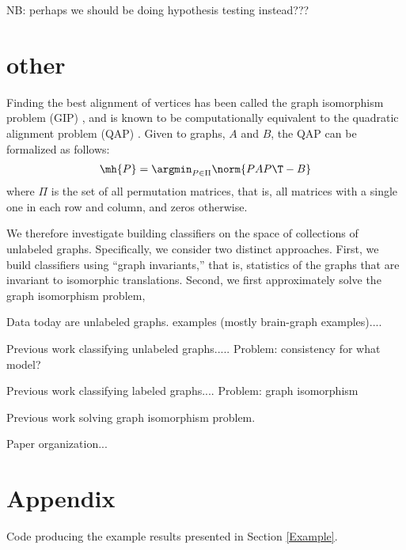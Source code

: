 NB: perhaps we should be doing hypothesis testing instead???



\section{other} %
\label{sec:other}



Finding the best alignment of vertices has been called the graph isomorphism problem (GIP) \cite{??}, and is known to be computationally equivalent to the quadratic alignment problem (QAP) \cite{??}.  Given to graphs, $A$ and $B$, the QAP can be formalized as follows:
\begin{align}
	\mh{P} = \argmin_{P \in \Pi} \norm{PAP\T - B}
\end{align}
where $\Pi$ is the set of all permutation matrices, that is, all matrices with a single one in each row and column, and zeros otherwise.  


We therefore investigate building classifiers on the space of collections of unlabeled graphs.  Specifically, we consider two distinct approaches. First, we build classifiers using ``graph invariants,'' that is, statistics of the graphs that are invariant to isomorphic translations.  Second, we first approximately solve the graph isomorphism problem,  



Data today are unlabeled graphs.  examples (mostly brain-graph examples)....

Previous work classifying unlabeled graphs..... Problem: consistency for what model?

Previous work classifying labeled graphs.... Problem: graph isomorphism

Previous work solving graph isomorphism problem.

Paper organization...


\section*{Appendix}

Code producing the example results presented in Section \ref{Example}.

